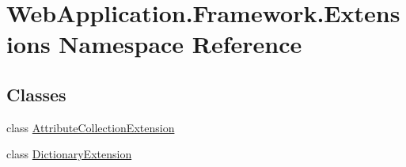 \hypertarget{namespaceWebApplication_1_1Framework_1_1Extensions}{}\section{Web\+Application.\+Framework.\+Extensions Namespace Reference}
\label{namespaceWebApplication_1_1Framework_1_1Extensions}
\subsection*{Classes}
\begin{DoxyCompactItemize}
\item 
class \mbox{\hyperlink{classWebApplication_1_1Framework_1_1Extensions_1_1AttributeCollectionExtension}{Attribute\+Collection\+Extension}}
\item 
class \mbox{\hyperlink{classWebApplication_1_1Framework_1_1Extensions_1_1DictionaryExtension}{Dictionary\+Extension}}
\end{DoxyCompactItemize}
